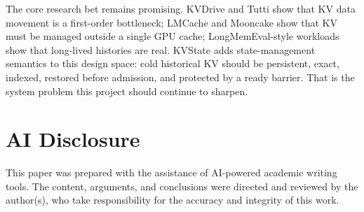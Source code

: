 \documentclass[sigconf,review,anonymous]{acmart}
\newcommand{\system}{KVState\xspace}
\begin{document}
The core research bet remains promising. KVDrive and Tutti show that KV data
movement is a first-order bottleneck; LMCache and Mooncake show that KV must be
managed outside a single GPU cache; LongMemEval-style workloads show that
long-lived histories are real. \system adds state-management semantics to this
design space: cold historical KV should be persistent, exact, indexed, restored
before admission, and protected by a ready barrier. That is the system problem
this project should continue to sharpen.

\section*{AI Disclosure}

This paper was prepared with the assistance of AI-powered academic writing
tools. The content, arguments, and conclusions were directed and reviewed by
the author(s), who take responsibility for the accuracy and integrity of this
work.



\end{document}

